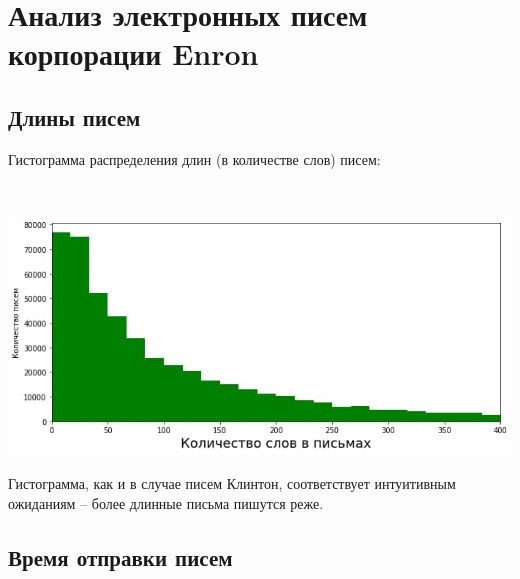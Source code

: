 \section{Анализ электронных писем корпорации Enron}

\subsection{Длины писем}

Гистограмма распределения длин (в количестве слов) писем:

$ $

\includegraphics[scale=0.75]{pics/enron_emails_words_count.jpg}

Гистограмма, как и в случае писем Клинтон, соответствует интуитивным ожиданиям -- более длинные письма пишутся реже. 

\subsection{Время отправки писем}


